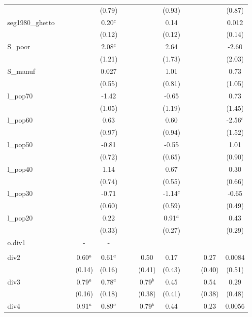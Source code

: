 \documentclass[]{article}
\begin{document}
\begin{tabular}{lcccccccccccc}
 &  &  &  & (0.79) &  &  &  & (0.93) &  &  &  & (0.87) \\
seg1980\_ghetto &  &  &  & 0.20$^c$ &  &  &  & 0.14 &  &  &  & 0.012 \\
 &  &  &  & (0.12) &  &  &  & (0.12) &  &  &  & (0.14) \\
S\_poor &  &  &  & 2.08$^c$ &  &  &  & 2.64 &  &  &  & -2.60 \\
 &  &  &  & (1.21) &  &  &  & (1.73) &  &  &  & (2.03) \\
S\_manuf &  &  &  & 0.027 &  &  &  & 1.01 &  &  &  & 0.73 \\
 &  &  &  & (0.55) &  &  &  & (0.81) &  &  &  & (1.05) \\
l\_pop70 &  &  &  & -1.42 &  &  &  & -0.65 &  &  &  & 0.73 \\
 &  &  &  & (1.05) &  &  &  & (1.19) &  &  &  & (1.45) \\
l\_pop60 &  &  &  & 0.63 &  &  &  & 0.60 &  &  &  & -2.56$^c$ \\
 &  &  &  & (0.97) &  &  &  & (0.94) &  &  &  & (1.52) \\
l\_pop50 &  &  &  & -0.81 &  &  &  & -0.55 &  &  &  & 1.01 \\
 &  &  &  & (0.72) &  &  &  & (0.65) &  &  &  & (0.90) \\
l\_pop40 &  &  &  & 1.14 &  &  &  & 0.67 &  &  &  & 0.30 \\
 &  &  &  & (0.74) &  &  &  & (0.55) &  &  &  & (0.66) \\
l\_pop30 &  &  &  & -0.71 &  &  &  & -1.14$^c$ &  &  &  & -0.65 \\
 &  &  &  & (0.60) &  &  &  & (0.59) &  &  &  & (0.49) \\
l\_pop20 &  &  &  & 0.22 &  &  &  & 0.91$^a$ &  &  &  & 0.43 \\
 &  &  &  & (0.33) &  &  &  & (0.27) &  &  &  & (0.29) \\
o.div1 &  &  & - & - &  &  &  &  &  &  &  &  \\
 &  &  &  &  &  &  &  &  &  &  &  &  \\
div2 &  &  & 0.60$^a$ & 0.61$^a$ &  &  & 0.50 & 0.17 &  &  & 0.27 & 0.0084 \\
 &  &  & (0.14) & (0.16) &  &  & (0.41) & (0.43) &  &  & (0.40) & (0.51) \\
div3 &  &  & 0.79$^a$ & 0.78$^a$ &  &  & 0.79$^b$ & 0.45 &  &  & 0.54 & 0.29 \\
 &  &  & (0.16) & (0.18) &  &  & (0.38) & (0.41) &  &  & (0.38) & (0.48) \\
div4 &  &  & 0.91$^a$ & 0.89$^a$ &  &  & 0.79$^b$ & 0.44 &  &  & 0.23 & 0.0056 \\

\end{tabular}
\end{document}
